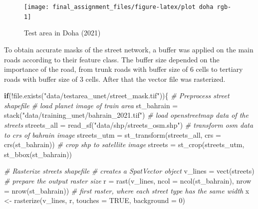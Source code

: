 \documentclass[
]{article}
\newenvironment{Shaded}{\begin{snugshade}}{\end{snugshade}}
\newcommand{\AttributeTok}[1]{\textcolor[rgb]{0.77,0.63,0.00}{#1}}
\newcommand{\CommentTok}[1]{\textcolor[rgb]{0.56,0.35,0.01}{\textit{#1}}}
\newcommand{\ConstantTok}[1]{\textcolor[rgb]{0.00,0.00,0.00}{#1}}
\newcommand{\ControlFlowTok}[1]{\textcolor[rgb]{0.13,0.29,0.53}{\textbf{#1}}}
\newcommand{\DecValTok}[1]{\textcolor[rgb]{0.00,0.00,0.81}{#1}}
\newcommand{\FunctionTok}[1]{\textcolor[rgb]{0.00,0.00,0.00}{#1}}
\newcommand{\NormalTok}[1]{#1}
\newcommand{\OtherTok}[1]{\textcolor[rgb]{0.56,0.35,0.01}{#1}}
\newcommand{\SpecialCharTok}[1]{\textcolor[rgb]{0.00,0.00,0.00}{#1}}
\newcommand{\StringTok}[1]{\textcolor[rgb]{0.31,0.60,0.02}{#1}}
\begin{document}
\begin{figure}

{\centering \texttt{[image: final\_assignment\_files/figure-latex/plot doha rgb-1]} 

}

\caption{Test area in Doha (2021)}\label{fig:plot doha rgb}
\end{figure}

To obtain accurate masks of the street network, a buffer was applied on
the main roads according to their feature class. The buffer size
depended on the importance of the road, from trunk roads with buffer
size of 6 cells to tertiary roads with buffer size of 3 cells. After
that the vector file was rasterized.

\begin{Shaded}
\begin{Highlighting}[]
\ControlFlowTok{if}\NormalTok{(}\SpecialCharTok{!}\FunctionTok{file.exists}\NormalTok{(}\StringTok{"data/testarea\_unet/street\_mask.tif"}\NormalTok{))\{}
  \CommentTok{\# Preprocess street shapefile}
  \CommentTok{\# load planet image of train area}
\NormalTok{  st\_bahrain }\OtherTok{=} \FunctionTok{stack}\NormalTok{(}\StringTok{"data/training\_unet/bahrain\_2021.tif"}\NormalTok{)}
  \CommentTok{\# load openstreetmap data of the streets}
\NormalTok{  streets\_all }\OtherTok{=} \FunctionTok{read\_sf}\NormalTok{(}\StringTok{"data/shp/streets\_osm.shp"}\NormalTok{)}
  \CommentTok{\# transform osm data to crs of bahrain image}
\NormalTok{  streets\_utm }\OtherTok{=} \FunctionTok{st\_transform}\NormalTok{(streets\_all, }\AttributeTok{crs =} \FunctionTok{crs}\NormalTok{(st\_bahrain))}
  \CommentTok{\# crop shp to satellite image}
\NormalTok{  streets }\OtherTok{=} \FunctionTok{st\_crop}\NormalTok{(streets\_utm, }\FunctionTok{st\_bbox}\NormalTok{(st\_bahrain))}
  
  \CommentTok{\# Rasterize streets shapefile}
  \CommentTok{\# creates a SpatVector object}
\NormalTok{  v\_lines }\OtherTok{=} \FunctionTok{vect}\NormalTok{(streets)}
  \CommentTok{\# prepare the output raster size}
\NormalTok{  r }\OtherTok{=} \FunctionTok{rast}\NormalTok{(v\_lines, }\AttributeTok{ncol =} \FunctionTok{ncol}\NormalTok{(st\_bahrain), }\AttributeTok{nrow =} \FunctionTok{nrow}\NormalTok{(st\_bahrain))}
  \CommentTok{\# first raster, where each street type has the same width}
\NormalTok{  x }\OtherTok{\textless{}{-}} \FunctionTok{rasterize}\NormalTok{(v\_lines, r, }\AttributeTok{touches =} \ConstantTok{TRUE}\NormalTok{, }\AttributeTok{background =} \DecValTok{0}\NormalTok{)}
  

\end{Highlighting}
\end{Shaded}
\end{document}
